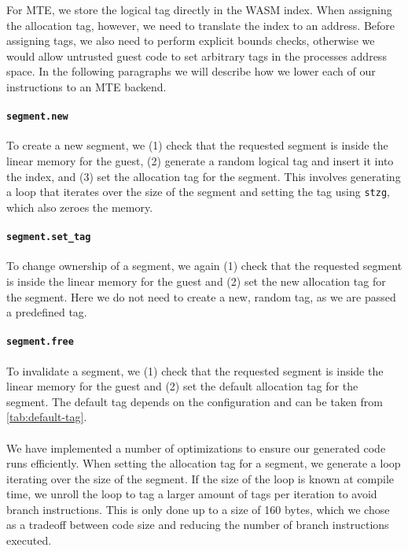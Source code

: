 For \ac{MTE}, we store the logical tag directly in the \ac{WASM} index.
When assigning the allocation tag, however, we need to translate the index to an address.
Before assigning tags, we also need to perform explicit bounds checks, otherwise we would allow untrusted guest code to set arbitrary tags in the processes address space.
In the following paragraphs we will describe how we lower each of our instructions to an \ac{MTE} backend.

\paragraph{\lstinline[style=customwasm]{segment.new}} To create a new segment, we (1) check that the requested segment is inside the linear memory for the guest, (2) generate a random logical tag and insert it into the index, and (3) set the allocation tag for the segment.
This involves generating a loop that iterates over the size of the segment and setting the tag using \texttt{stzg}, which also zeroes the memory.

\paragraph{\lstinline[style=customwasm]{segment.set_tag}} To change ownership of a segment, we again (1) check that the requested segment is inside the linear memory for the guest and (2) set the new allocation tag for the segment.
Here we do not need to create a new, random tag, as we are passed a predefined tag.

\paragraph{\lstinline[style=customwasm]{segment.free}} To invalidate a segment, we (1) check that the requested segment is inside the linear memory for the guest and (2) set the default allocation tag for the segment.
The default tag depends on the configuration and can be taken from \cref{tab:default-tag}.

\paragraph{}
We have implemented a number of optimizations to ensure our generated code runs efficiently.
When setting the allocation tag for a segment, we generate a loop iterating over the size of the segment.
If the size of the loop is known at compile time, we unroll the loop to tag a larger amount of tags per iteration to avoid branch instructions.
This is only done up to a size of 160 bytes, which we chose as a tradeoff between code size and reducing the number of branch instructions executed.

